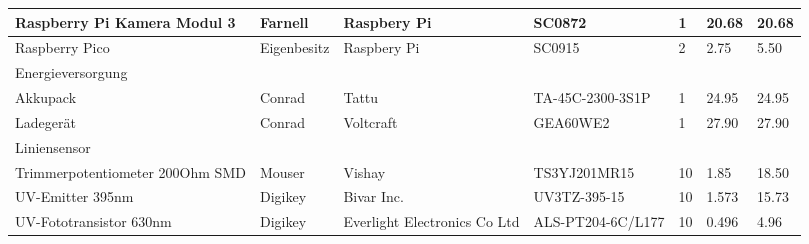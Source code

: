 \documentclass[main.tex]{subfiles} %
\begin{document}
\begin{table}[htbp]
{\begin{tabular}{|p{3cm}|p{2.5cm}|p{2.5cm}|p{3cm}|p{1cm}|p{1.5cm}|p{1cm}|}
            Raspberry Pi Kamera Modul 3             & Farnell            & Raspbery Pi                  & SC0872                  & 1               & 20.68                     & 20.68                       \\ \hline
            Raspberry Pico                          & Eigenbesitz        & Raspbery Pi                  & SC0915                  & 2               & 2.75                      & 5.50                        \\ \hline
            \rowcolor{lightgray} Energieversorgung  &                    &                              &                         &                 &                           &                                 \\ \hline
            Akkupack                                & Conrad             & Tattu                        & TA-45C-2300-3S1P        & 1               & 24.95                     & 24.95                        \\ \hline
            Ladegerät                               & Conrad             & Voltcraft                    & GEA60WE2                & 1               & 27.90                     & 27.90                           \\ \hline
            \rowcolor{lightgray} Liniensensor       &                    &                              &                         &                 &                           &                             \\ \hline
            Trimmerpotentiometer 200Ohm SMD         & Mouser             & Vishay                       & TS3YJ201MR15            & 10              & 1.85                      & 18.50                        \\ \hline
            UV-Emitter 395nm                        & Digikey            & Bivar Inc.                   & UV3TZ-395-15            & 10              & 1.573                     & 15.73                       \\ \hline
            UV-Fototransistor 630nm                 & Digikey            & Everlight Electronics Co Ltd & ALS-PT204-6C/L177       & 10              & 0.496                     & 4.96                        \\ \hline

\end{tabular}}
\end{table}
\end{document}
